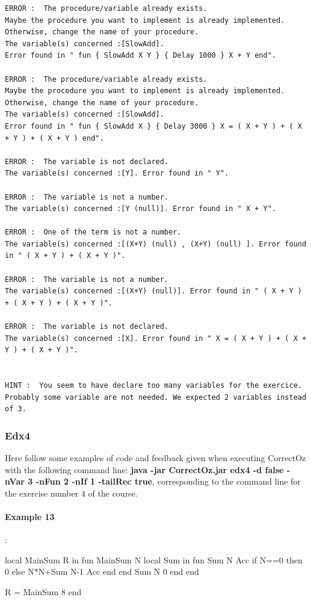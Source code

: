 \documentclass[11pt,a4paper,twoside,openright]{report}
\begin{document}
\begin{lstlisting}
ERROR :  The procedure/variable already exists. 
Maybe the procedure you want to implement is already implemented. 
Otherwise, change the name of your procedure. 
The variable(s) concerned :[SlowAdd]. 
Error found in " fun { SlowAdd X Y } { Delay 1000 } X + Y end".

ERROR :  The procedure/variable already exists. 
Maybe the procedure you want to implement is already implemented. 
Otherwise, change the name of your procedure. 
The variable(s) concerned :[SlowAdd]. 
Error found in " fun { SlowAdd X } { Delay 3000 } X = ( X + Y ) + ( X + Y ) + ( X + Y ) end".

ERROR :  The variable is not declared. 
The variable(s) concerned :[Y]. Error found in " Y".

ERROR :  The variable is not a number. 
The variable(s) concerned :[Y (null)]. Error found in " X + Y".

ERROR :  One of the term is not a number. 
The variable(s) concerned :[(X+Y) (null) , (X+Y) (null) ]. Error found in " ( X + Y ) + ( X + Y )".

ERROR :  The variable is not a number. 
The variable(s) concerned :[(X+Y) (null)]. Error found in " ( X + Y ) + ( X + Y ) + ( X + Y )".

ERROR :  The variable is not declared. 
The variable(s) concerned :[X]. Error found in " X = ( X + Y ) + ( X + Y ) + ( X + Y )".


HINT :  You seem to have declare too many variables for the exercice. 
Probably some variable are not needed. We expected 2 variables instead of 3.

\end{lstlisting}


\subsubsection{Edx4}
Here follow some examples of code and feedback given when executing 
 CorrectOz with the following command line: \textbf{java -jar CorrectOz.jar edx4 -d 
false -nVar 3 -nFun 2 -nIf 1 -tailRec true}, corresponding to 
the command line for the exercise number 4 of the course.


\paragraph{Example 13}:

\begin{OZ}
local MainSum R in
	fun {MainSum N}
        	local Sum in
	            fun {Sum N Acc}
        	        if N==0 then 0
				else N*N+{Sum N-1 Acc}
			end
	            end
        	    {Sum N 0}
        	end
    	end

	R = {MainSum 8}
end
\end{OZ}
\end{document}
